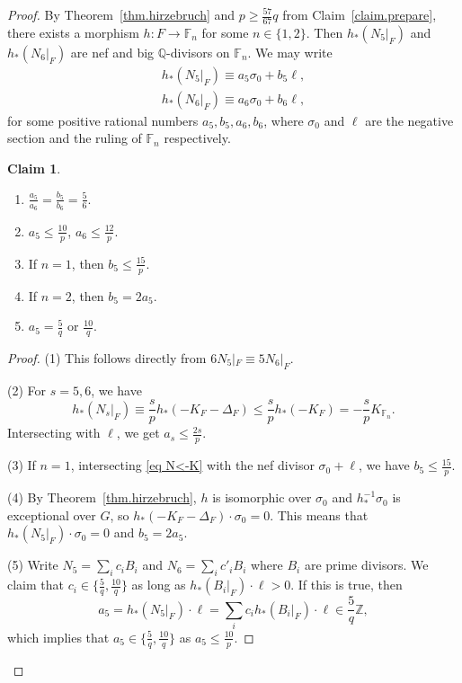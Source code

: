 \documentclass[12pt,twoside]{amsart}
\theoremstyle{definition}
\newtheorem{claim}[thm]{Claim}
\begin{document}
\begin{proof}
    By Theorem~\ref{thm.hirzebruch} and  $p\geq \frac{57}{67}q$ from  Claim~\ref{claim.prepare}, there exists a morphism $h\colon F\to \mathbb F_n$ for some $n\in \{1,2\}$. Then $h_*(N_{5}|_F)$ and $h_*(N_{6}|_F)$ are nef and big $\mathbb{Q}$-divisors on $\mathbb{F}_n$. We may write 
    \begin{align*}
        h_*(N_{5}|_F)\equiv a_5\sigma_0+b_5\ell,\\
        h_*(N_{6}|_F)\equiv a_6\sigma_0+b_6\ell,
    \end{align*}
    for some positive rational numbers $a_5,b_5, a_6, b_6$, where $\sigma_0$ and $\ell$ are the negative section and the ruling of $\mathbb{F}_n$ respectively. 

    \begin{claim}\label{claim.final}
        \begin{enumerate}
            \item $\frac{a_5}{a_6}=\frac{b_5}{b_6}=\frac56$.
            \item $a_5\leq \frac{10}{p}$,  $a_6\leq \frac{12}{p}$.
            \item If $n=1$, then $b_5\leq \frac{15}{p}$.
            \item If $n=2$, then $b_5=2a_5$.
            \item $a_5=\frac{5}{q}$ or $\frac{10}{q}$.
        \end{enumerate}
    \end{claim}
    
    \begin{proof}
        (1) This follows directly from $6N_5|_F\equiv 5N_6|_F$. 

        (2) For $s=5,6$, we have
        \begin{equation}
            h_*(N_{s}|_F)\equiv \frac{s}{p}h_*(-K_F-\Delta_F)\leq \frac{s}{p}h_*(-K_F)= -\frac{s}{p}K_{\mathbb{F}_n}.\label{eq N<-K}
        \end{equation} 
        Intersecting with $\ell$, we get $a_s\leq \frac{2s}{p}$.

        (3)  If $n=1$, intersecting \eqref{eq N<-K} with the nef divisor $\sigma_0+\ell$, we have $b_5\leq \frac{15}{p}$. 

        (4) By Theorem~\ref{thm.hirzebruch}, $h$ is isomorphic over $\sigma_0$ and $h_*^{-1}\sigma_0$ is exceptional over $G$, so $h_*(-K_F-\Delta_F)\cdot \sigma_0=0$. This means that $h_*(N_{5}|_F)\cdot \sigma_0=0$ and $b_5=2a_5$. 
 
        (5) Write $N_5=\sum_{i}c_iB_i$ and $N_6=\sum_{i}c'_iB_i$ where $B_i$ are prime divisors. We claim that $c_i\in \{\frac{5}{q}, \frac{10}{q}\}$ as long as $h_*(B_i|_F)\cdot \ell>0$. If this is true, then 
        \[
            a_5=h_*(N_5|_F)\cdot \ell=\sum_ic_ih_*(B_i|_F)\cdot \ell\in \frac{5}{q}\mathbb{Z},
        \]
        which implies that $a_5\in \{\frac{5}{q}, \frac{10}{q}\}$ as $a_5\leq \frac{10}{p}$.


\end{proof}
\end{proof}
\end{document}

